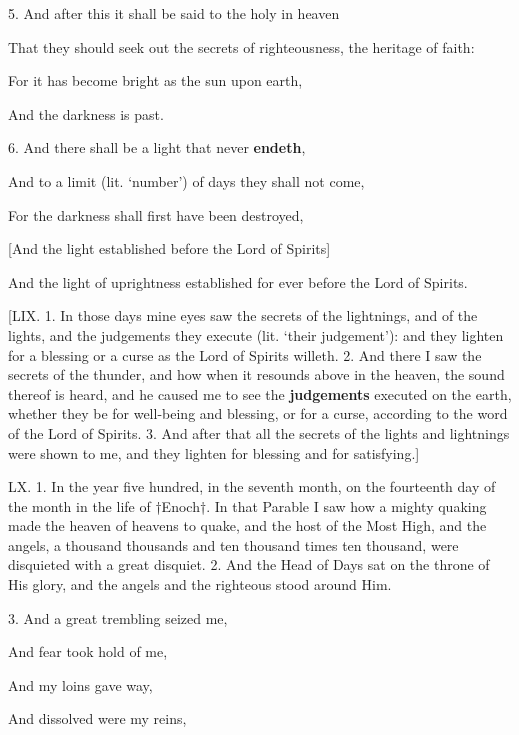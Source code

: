 5. And after this it shall be said to the holy in heaven

That they should seek out the secrets of righteousness, the heritage of faith:

For it has become bright as the sun upon earth,

And the darkness is past.

6. And there shall be a light that never \textbf{endeth},

And to a limit (lit. ‘number’) of days they shall not come,

For the darkness shall first have been destroyed,

[And the light established before the Lord of Spirits]

And the light of uprightness established for ever before the Lord of Spirits.


[LIX. 1. In those days mine eyes saw the secrets of
the lightnings, and of the lights, and the judgements
they execute (lit. ‘their judgement’): and they
lighten for a blessing or a curse as the Lord of Spirits
willeth. 2. And there I saw the secrets of the thunder,
and how when it resounds above in the heaven, the
sound thereof is heard, and he caused me to see the
\textbf{judgements} executed on the earth, whether they be
for well-being and blessing, or for a curse, according
to the word of the Lord of Spirits. 3. And after
that all the secrets of the lights and lightnings were
shown to me, and they lighten for blessing and for
satisfying.]



LX. 1. In the year five hundred, in the seventh
month, on the fourteenth day of the month in the
life of †Enoch†. In that Parable I saw how a mighty
quaking made the heaven of heavens to quake, and
the host of the Most High, and the angels, a thousand
thousands and ten thousand times ten thousand,
were disquieted with a great disquiet. 2. And the
Head of Days sat on the throne of His glory, and the
angels and the righteous stood around Him.

3. And a great trembling seized me,

And fear took hold of me,

And my loins gave way,

And dissolved were my reins,

